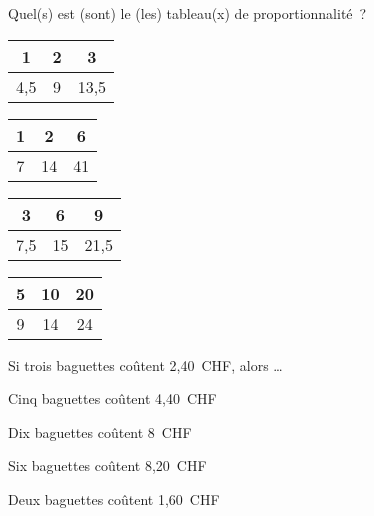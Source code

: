 \begin{QCM}
\begin{GroupeQCM}
    
    \begin{exercice}
      Quel(s) est (sont) le (les) tableau(x) de proportionnalité ?
      \begin{ChoixQCM}{4}
      \item
       \begin{tabular}{|c|c|c|}
       \hline
        1 & 2 & 3 \\\hline
        4,5 & 9 & 13,5 \\\hline
        \end{tabular}
      \item
       \begin{tabular}{|c|c|c|}
       \hline
        1 & 2 & 6 \\\hline
        7 & 14 & 41 \\\hline
        \end{tabular}
      \item
       \begin{tabular}{|c|c|c|}
       \hline
        3 & 6 & 9 \\\hline
        7,5 & 15 & 21,5 \\\hline
        \end{tabular}
      \item
       \begin{tabular}{|c|c|c|}
       \hline
        5 & 10 & 20 \\\hline
        9 & 14 & 24 \\\hline
        \end{tabular}
      \end{ChoixQCM}
\begin{corrige}
   \end{corrige}
    \end{exercice}
    
    
    \begin{exercice}
      Si trois baguettes coûtent 2,40 CHF, alors \ldots
      \begin{ChoixQCM}{4}
      \item Cinq baguettes coûtent 4,40 CHF
      \item Dix baguettes coûtent 8 CHF
      \item Six baguettes coûtent 8,20 CHF
      \item Deux baguettes coûtent 1,60 CHF
      \end{ChoixQCM}
\begin{corrige}
   \end{corrige}
    \end{exercice}
    

\end{GroupeQCM}
\end{QCM}
